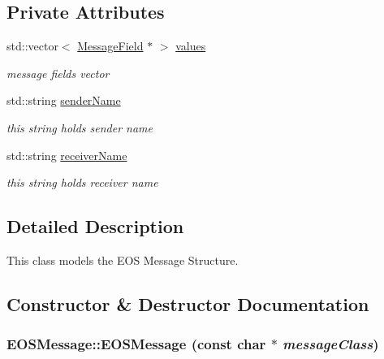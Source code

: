 \subsection*{Private Attributes}
\begin{CompactItemize}
\item 
std::vector$<$ \hyperlink{classMessageField}{MessageField} $\ast$ $>$ \hyperlink{classEOSMessage_96ec4e4136d8098a9de40eda92f49dc2}{values}
\begin{CompactList}\small\item\em message fields vector \item\end{CompactList}\item 
std::string \hyperlink{classEOSMessage_0d4527e99c9d665cd65b3cd753ef59df}{senderName}
\begin{CompactList}\small\item\em this string holds sender name \item\end{CompactList}\item 
std::string \hyperlink{classEOSMessage_e2b133e9168915c7c0daf1116aed816b}{receiverName}
\begin{CompactList}\small\item\em this string holds receiver name \item\end{CompactList}\end{CompactItemize}


\subsection{Detailed Description}
This class models the EOS Message Structure. 

\subsection{Constructor \& Destructor Documentation}
\hypertarget{classEOSMessage_4f107c4d2bc222fff75d0a600f8ebfa9}{
\subsubsection[{EOSMessage}]{\setlength{\rightskip}{0pt plus 5cm}EOSMessage::EOSMessage (const char $\ast$ {\em messageClass})}}
\label{classEOSMessage_4f107c4d2bc222fff75d0a600f8ebfa9}


